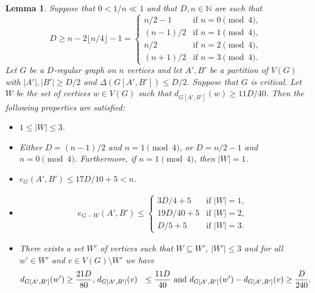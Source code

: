 \documentclass{memo-l}
\newtheorem{lemma}[firstthm]{Lemma}
\def\COMMENT#1{}
\numberwithin{section}{chapter}
\numberwithin{equation}{section}
\numberwithin{firstthm}{section}
\numberwithin{figure}{section}
\begin{document}
{\begin{lemma} \label{critical'}
Suppose that $0< 1/n \ll 1$ and that $D, n \in \mathbb N$ are such that
\begin{equation} \label{minexact'}
D\ge n - 2\lfloor n/4 \rfloor -1=
\begin{cases}
n/2-1 & \textrm{if $n = 0 \pmod 4$,}\\
(n-1)/2 & \textrm{if $n = 1 \pmod 4$,}\\
n/2 & \textrm{if $n = 2 \pmod 4$,}\\
(n+1)/2 & \textrm{if $n = 3 \pmod 4$.}
\end{cases}
\end{equation}
Let $G$ be a $D$-regular graph on $n$ vertices and let $A',B'$ be a partition of $V(G)$ with $|A'|,|B'| \ge D/2$ and $\Delta(G[A',B']) \le D/2$.
Suppose that $G$ is critical.
Let $W$ be the set of vertices $w \in V(G)$ such that $d_{G[A',B']}(w) \ge 11D/40$.
Then the following properties are satisfied:%
\begin{itemize}
	\item[$ \rm (i)$] $1 \le |W| \le 3$.
	\item[$ \rm (ii)$] Either $D = (n-1)/2$ and $n = 1 \pmod{4}$, or $D = n/2-1$ and $n = 0 \pmod{4}$.
	Furthermore, if $n =1 \pmod{4}$, then $|W|=1$.
	\item[$\rm (iii)$] $e_{G}(A',B') \le 17D/10+5 < n$.
	\item[$\rm (iv)$] \begin{align*}
e_{G- W}(A',B') \le 
\begin{cases}
3D/4+5	& \textrm{if $|W|=1$,} \\
19D/{40}+5	& \textrm{if $|W|=2$,} \\
D/5+5	& \textrm{if $|W|=3$.}
\end{cases}
\end{align*}
	\item[$ \rm (v)$] There exists a set $W'$ of vertices such that $W \subseteq W'$, $|W'| \le 3$ and for all $w' \in W'$ and $v \in V(G) \setminus W'$
	we have 
\begin{align*}
d_{G[A',B']}(w') & \ge \frac{21D}{80}, \, 
d_{G[A',B']}(v) & \le \frac{11D}{40} \
{\rm and} & \
d_{G[A',B']}(w') - d_{G[A',B']}(v) \ge \frac{D}{240}.
\end{align*}
	\end{itemize}

\end{lemma}}
\end{document}
